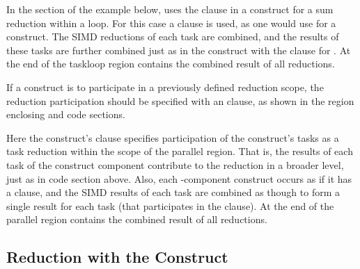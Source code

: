 In the  section of the example below,
 uses the  clause 
in a  construct for a sum reduction within a loop.
For this case a  clause is used, as one would use 
for a  construct.
The SIMD reductions of each task are combined, and the results of these tasks are further 
combined just as in the  construct with the  clause for .
At the end of the taskloop region  contains the combined result of all reductions.

If a  construct is to participate in a previously defined 
reduction scope, the reduction participation should be specified with
an  clause, as shown in the  region enclosing
 and  code sections.  

Here the  construct's 
 clause specifies participation of the construct's tasks as 
a task reduction within the scope of the parallel region.  
That is, the results of each task of the  construct component 
contribute to the reduction in a broader level, just as in  code section above.
Also, each -component construct
occurs as if it has a  clause, and the
SIMD results of each task are combined as though to form a single result for
each task (that participates in the  clause).
At the end of the parallel region  contains the combined result of all reductions.






\subsection{Reduction with the  Construct}
\label{subsec:reduction_scope}

